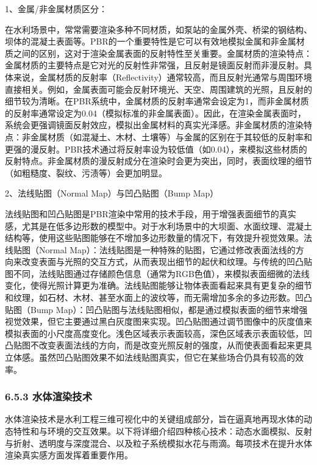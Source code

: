 1、金属/非金属材质区分：

在水利场景中，常常需要渲染多种不同材质，如泵站的金属外壳、桥梁的钢结构、坝体的混凝土表面等。PBR的一个重要特性是它可以有效地模拟金属和非金属材质之间的区别，这对于渲染金属表面的反射特性至关重要。金属材质的渲染特点：金属材质的主要特点是它对光的反射性非常强，且反射是镜面反射而非漫反射。具体来说，金属材质的反射率（Reflectivity）通常较高，而且反射光通常与周围环境直接相关。例如，金属表面可能会反射环境光、天空、周围建筑的光照，且反射的细节较为清晰。在PBR系统中，金属材质的反射率通常会设定为1，而非金属材质的反射率通常设定为0.04（模拟标准的非金属表面）。因此，在渲染金属表面时，系统会更强调镜面反射效应，模拟出金属材料的真实光泽感。非金属材质的渲染特点：非金属材质（如混凝土、木材、土壤等）与金属的区别在于其较低的反射率和更强的漫反射。PBR技术通过将反射率设为较低值（如0.04），来模拟这些材质的反射特点。非金属材质的漫反射成分在渲染时会更为突出，同时，表面纹理的细节（如粗糙度、裂纹、污渍等）会更加明显。

2、法线贴图（Normal Map）与凹凸贴图（Bump Map）

法线贴图和凹凸贴图是PBR渲染中常用的技术手段，用于增强表面细节的真实感，尤其是在低多边形数的模型中。对于水利场景中的大坝面、水面纹理、混凝土结构等，使用这些贴图能够在不增加多边形数量的情况下，有效提升视觉效果。法线贴图（Normal Map）：法线贴图是一种特殊的贴图，它通过修改表面法线的方向来改变表面与光照的交互方式，从而表现出细节的起伏和纹理。与传统的凹凸贴图不同，法线贴图通过存储颜色信息（通常为RGB色值），来模拟表面细微的法线变化，使得光照计算更为准确。法线贴图能够让物体表面看起来具有更复杂的细节和纹理，如石材、木材、甚至水面上的波纹等，而无需增加多余的多边形数。凹凸贴图（Bump Map）：凹凸贴图与法线贴图相似，都是通过模拟表面的细节来增强视觉效果，但它主要通过黑白灰度图来实现。凹凸贴图通过调节图像中的灰度值来模拟表面的小尺度高度变化。浅色区域表示表面较高，深色区域表示表面较低，凹凸贴图不改变表面法线的方向，而是改变光照反射的强度，从而使表面看起来更具立体感。虽然凹凸贴图效果不如法线贴图真实，但它在某些场合仍具有较高的效率。

\hypertarget{ux6c34ux4f53ux6e32ux67d3ux6280ux672f}{%
\subsubsection{6.5.3 水体渲染技术}\label{ux6c34ux4f53ux6e32ux67d3ux6280ux672f}}

水体渲染技术是水利工程三维可视化中的关键组成部分，旨在逼真地再现水体的动态特性和与环境的交互效果。以下将详细介绍四种核心技术：动态水面模拟、反射与折射、透明度与深度混合、以及粒子系统模拟水花与雨滴。每项技术在提升水体渲染真实感方面发挥着重要作用。

